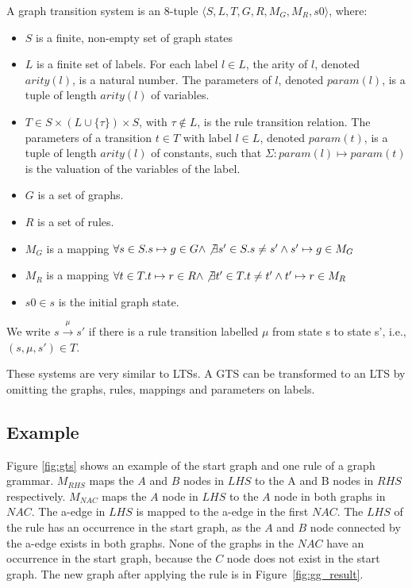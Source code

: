 \begin{definition}
A graph transition system is an 8-tuple	$\langle S, L, T, G, R, M_G, M_R, s0\rangle$, where:
\begin{itemize}
\item $S$ is a finite, non-empty set of graph states
\item $L$ is a finite set of labels. For each label $l\in L$, the arity of $l$, denoted $\mathit{arity(l)}$, is a natural number. The parameters of $l$, denoted $\mathit{param(l)}$, is a tuple of length $\mathit{arity(l)}$ of variables.
\item $T \in S \times (L \cup \{\tau\}) \times S$, with $\tau \notin L$, is the rule transition relation. The parameters of a transition $t \in T$ with label $l \in L$, denoted $\mathit{param(t)}$, is a tuple of length $\mathit{arity(l)}$ of constants, such that $\Sigma:\mathit{param(l)} \mapsto \mathit{param(t)}$ is the valuation of the variables of the label.
\item $G$ is a set of graphs.
\item $R$ is a set of rules.
\item $M_G$ is a mapping $\forall s \in S . s \mapsto g \in G \land \not\exists s' \in S . s \neq s' \land s' \mapsto g \in M_G$
\item $M_R$ is a mapping $\forall t \in T . t \mapsto r \in R \land \not\exists t' \in T . t \neq t' \land t' \mapsto r \in M_R$
\item $s0 \in s$ is the initial graph state.
\end{itemize}
We write $s \xrightarrow{\mu}s'$ if there is a rule transition labelled $\mu$ from state s to state s', i.e., $(s, \mu, s') \in T$.
\end{definition}

These systems are very similar to LTSs. A GTS can be transformed to an LTS by omitting the graphs, rules, mappings and parameters on labels.

\subsection{Example}\label{sec:gts_example}
Figure \ref{fig:gts} shows an example of the start graph and one rule of a graph grammar. $\mathit{M_{RHS}}$ maps the $A$ and $B$ nodes in $\mathit{LHS}$ to the A and B nodes in $\mathit{RHS}$ respectively. $\mathit{M_{NAC}}$ maps the $A$ node in $\mathit{LHS}$ to the $A$ node in both graphs in $\mathit{NAC}$. The a-edge in $\mathit{LHS}$ is mapped to the a-edge in the first $\mathit{NAC}$. The $\mathit{LHS}$ of the rule has an occurrence in the start graph, as the $A$ and $B$ node connected by the a-edge exists in both graphs. None of the graphs in the $\mathit{NAC}$ have an occurrence in the start graph, because the $C$ node does not exist in the start graph. The new graph after applying the rule is in Figure~\ref{fig:gg_result}.

